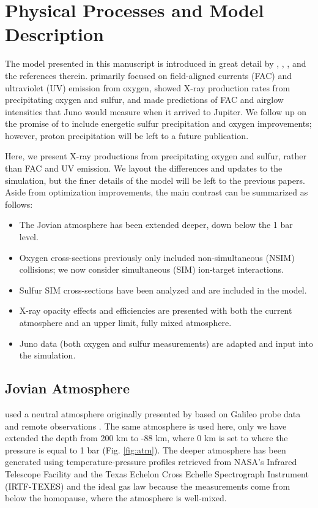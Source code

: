 \documentclass[draft]{agujournal2018}
\begin{document}
\section{Physical Processes and Model Description}

The model presented in this manuscript is introduced in great detail by \citet{houston2018}, \citet{ozak2010}, \citet{ozak2013}, and the references therein.
\citet{houston2018} primarily focused on field-aligned currents (FAC) and ultraviolet (UV) emission from oxygen, \citet{ozak2010} showed X-ray production rates from precipitating oxygen and sulfur, and \citet{ozak2013} made predictions of FAC and airglow intensities that Juno would measure when it arrived to Jupiter.
We follow up on the promise of \citet{houston2018} to include energetic sulfur precipitation and oxygen improvements; however, proton precipitation will be left to a future publication. 

Here, we present X-ray productions from precipitating oxygen and sulfur, rather than FAC and UV emission.
We layout the differences and updates to the simulation, but the finer details of the model will be left to the previous papers.
Aside from optimization improvements, the main contrast can be summarized as follows:
\begin{itemize}
\item The Jovian atmosphere has been extended deeper, down below the 1 bar level.
\item Oxygen cross-sections previously only included non-simultaneous (NSIM) collisions; we now consider simultaneous (SIM) ion-target interactions.
\item Sulfur SIM cross-sections have been analyzed and are included in the model.
\item X-ray opacity effects and efficiencies are presented with both the current atmosphere and an upper limit, fully mixed atmosphere.
\item Juno data (both oxygen and sulfur measurements) are adapted and input into the simulation.
\end{itemize}

\subsection{Jovian Atmosphere}

\citet{houston2018} used a neutral atmosphere originally presented by \citet{maurellis2001} based on Galileo probe data \citep{seiff1996,seiff1997} and remote observations \citep{sada1998}.
The same atmosphere is used here, only we have extended the depth from 200 km to -88 km, where 0 km is set to where the pressure is equal to 1 bar (Fig. \ref{fig:atm}).
The deeper atmosphere has been generated using temperature-pressure profiles retrieved from NASA's Infrared Telescope Facility and the Texas Echelon Cross Echelle Spectrograph Instrument (IRTF-TEXES) \citep{sinclair2018} and the ideal gas law because the measurements come from below the homopause, where the atmosphere is well-mixed.
\end{document}
